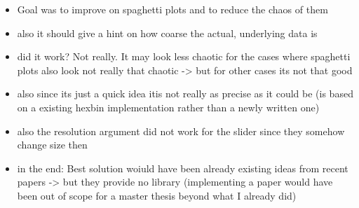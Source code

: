 \begin{itemize}
  \item Goal was to improve on spaghetti plots and to reduce the chaos of them 
  \item also it should give a hint on how coarse the actual, underlying data is 
  \item did it work? Not really. It may look less chaotic for the cases where spaghetti plots also look not really that chaotic -> but for other cases its not that good 
  \item also since its just a quick idea itis not really as precise as it could be (is based on a existing hexbin implementation rather than a newly written one)
  \item also the resolution argument did not work for the slider since they somehow change size then
  \item in the end: Best solution woiuld have been already existing ideas from recent papers -> but they provide no library (implementing a paper would have been out of scope for a master thesis beyond what I already did)

\end{itemize}

